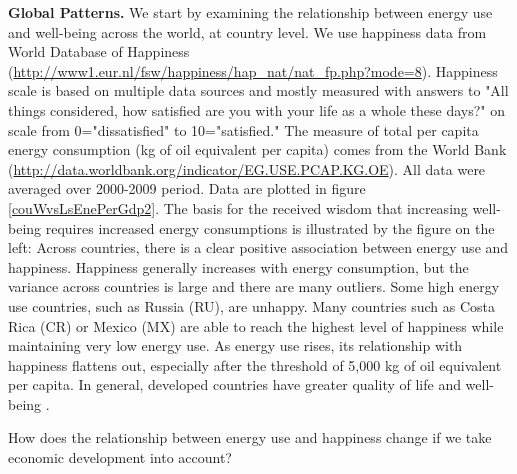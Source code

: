 \documentclass[10pt, letterpaper]{article}
\begin{document}
\begin{spacing}{1.5}
\textbf{Global Patterns.} We start by examining the relationship between energy
use and well-being across the world, at country level.  %
We use happiness data from World Database of Happiness
(\url{http://www1.eur.nl/fsw/happiness/hap_nat/nat_fp.php?mode=8}). 
  Happiness scale is based on multiple data sources and mostly measured with answers to
"All things considered, how satisfied are you with your life as a whole these
days?" on scale from 0="dissatisfied" to 10="satisfied." 
The measure of total per capita energy consumption (kg of oil equivalent per
capita) comes from the World Bank
(\url{http://data.worldbank.org/indicator/EG.USE.PCAP.KG.OE}). All data were averaged over 2000-2009 period. Data are plotted in figure \ref{couWvsLsEnePerGdp2}.
% 
%
 The basis for the received wisdom that increasing well-being requires increased
energy consumptions is illustrated by the figure on the left: Across countries,
there is a clear positive association between energy use and
happiness. Happiness generally increases with energy consumption, but the variance across
countries is large and there are many outliers. Some high energy use countries, such as
Russia (RU), are unhappy. Many countries such as Costa
Rica (CR) or Mexico (MX) are able to reach the highest level of happiness while
maintaining very low energy use. As energy use rises, its relationship with
happiness flattens out, especially after the threshold of 5,000 kg of oil equivalent per
capita. In general, developed countries have greater quality of life and
well-being \citep{mazur11, jorgenson14C}.

%
%
%
 How does the relationship between
energy use and happiness change if we take economic development into account?
%


\end{spacing}
\end{document}
